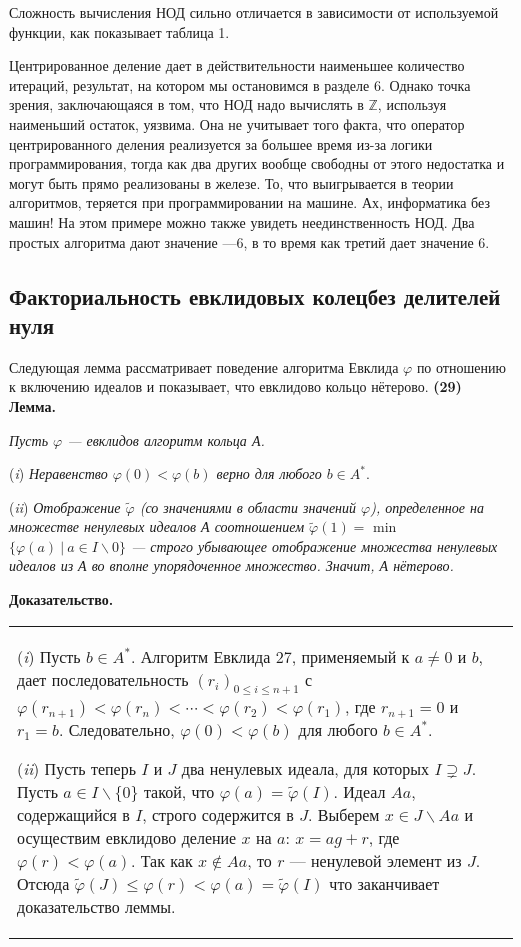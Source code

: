 \documentclass{mai_book}
\begin{document}
Сложность вычисления НОД сильно отличается в зависимости от используемой функции, как показывает таблица 1.

Центрированное деление дает в действительности наименьшее количество итераций, результат, на котором мы остановимся в разделе 6. Однако точка зрения, заключающаяся в том, что НОД надо вычислять в $\mathbb{Z}$, используя наименьший остаток, уязвима. Она не учитывает того факта, что оператор центрированного деления реализуется за большее время из-за логики программирования, тогда как два других вообще свободны от этого недостатка и могут быть прямо реализованы в железе. То, что выигрывается в теории алгоритмов, теряется при программировании на машине. Ах, информатика без машин! На этом примере можно также увидеть неединственность НОД. Два простых алгоритма дают значение —6, в то время как третий дает значение 6.

\subsection{Факториальность евклидовых колец\newline без делителей нуля}
Следующая лемма рассматривает поведение алгоритма Евклида $\varphi$ по отношению к включению идеалов и показывает, что евклидово кольцо нётерово.\newline
\textbf{(29) Лемма.}

\textit{Пусть $\varphi$ — евклидов алгоритм кольца А.}

(\textit{i}) \textit{Неравенство $\varphi(0) < \varphi(b)$ верно для любого $b \in A^*.$}

(\textit{ii}) \textit{Отображение $\tilde{\varphi}$ (со значениями в области значений $\varphi$), определенное на множестве ненулевых идеалов А соотношением $\tilde{\varphi}(1) =$} min\textit{$\{\varphi(a)\: |\: a \in I \backslash 0\} $ — строго убывающее отображение множества ненулевых идеалов из А во вполне упорядоченное множество. Значит, А нётерово.}
\pagebreak

\noindent\textbf{Доказательство.}\newline
\begin{tabular}{|p{13.5cm}}
(\textit{i}) Пусть $b \in A^*$. Алгоритм Евклида 27, применяемый к $a \neq 0$ и $b$, дает последовательность $(r_i)_{0\leqslant i\leqslant n+1}$ с $\varphi(r_{n+1})< \varphi(r_n)< \cdots < \varphi(r_2) <\varphi(r_1)$, где $r_{n+1} = 0$ и $r_1 = b$. Следовательно, $\varphi(0) < \varphi(b)$ для любого $b \in A^*$.\newline

(\textit{ii}) Пусть теперь $I$ и $J$ два ненулевых идеала, для которых $I \supsetneq J$. Пусть $a \in I \backslash  \{0\}$ такой, что $\varphi(a) = \tilde{\varphi}(I)$. Идеал $Aa$, содержащийся в $I$, строго содержится в $J$. Выберем $x \in J \backslash Aa$ и осуществим евклидово деление $x$ на $a$: $x = ag + r$, где $\varphi(r) < \varphi(a)$. Так как $x \notin Aa$, то $r$ — ненулевой элемент из $J$. Отсюда $\tilde{\varphi}(J)\leq \varphi(r) < \varphi(a) =\tilde{\varphi}(I)$ что заканчивает доказательство леммы.
\end{tabular}\newline\newline
\end{document}
